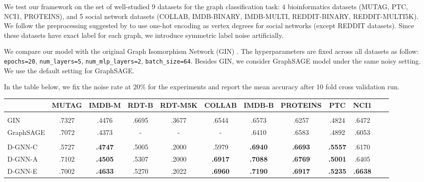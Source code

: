 \documentclass[portrait,final,a0paper,fontscale=0.365]{baposter}
\begin{document}
\begin{poster}
{\begin{multicols}{2}
\columnbreak

\vspace*{0.5em}
\noindent
We test our framework on the set of well-studied 9 datasets for the graph 
classification task: 4 bioinformatics datasets (MUTAG, PTC, NCI1, PROTEINS),
and 5 social network datasets (COLLAB, IMDB-BINARY, IMDB-MULTI, REDDIT-BINARY, REDDIT-MULTI5K). We follow the preprocessing suggested by \cite{xu2018how} 
to use one-hot encoding as vertex degrees for social networks (except REDDIT datasets). Since these datasets have exact 
label for each graph, we introduce symmetric label noise artificially.
\end{multicols}

\noindent
We compare our model with the original Graph Isomorphism Network (GIN) \cite{xu2018how}.
The hyperparameters are fixed across all datasets as follow: \texttt{epochs=20}, 
\texttt{num\_layers=5}, \texttt{num\_mlp\_layers=2}, \texttt{batch\_size=64}.
Besides GIN, we consider GraphSAGE model \cite{hamilton2017inductive} under the same noisy setting. We use the default setting for GraphSAGE.


\vspace{1em}
\noindent
In the table below, we fix the noise rate at 20\% for the experiments and report the mean accuracy after 10 fold cross validation run.  

\vspace{1em}

\hspace{1em}
  \begin{tabular}{lccccccccccc}
                                 & MUTAG   & IMDB-M    & RDT-B   & RDT-M5K & COLLAB    & IMDB-B   & PROTEINS    & PTC         & NCI1 \\
    \hline \\
    GIN                          & .7327   & .4476     & .6695   & .3677   & .6544     & .6573    & .6257       & .4824       & .6472 \\
    GraphSAGE                    & .7072   & .4373     &   -     & -       & -         & .6410    & .6583       & .4892       & .6053 
    \vspace{0.5em}\\
    \hline \vspace{-0.5em} \\
    D-GNN-C                      &  .5727  &  \bf.4747 & .5005   & .2000   &  .5979    & \bf.6940 & \bf.6693    & \bf.5557       &  .6170 \\
    D-GNN-A                      &  .7102  &  \bf.4505 & .5307   & .2000   &  \bf.6917 & \bf.7088 & \bf.6769    & \bf.5001       & .6405  \\
    D-GNN-E                      &  .7002  &  \bf.4633 & .5270   & .2022   &  \bf.6960 & \bf.7190 & \bf.6917    & \bf.5235       & \bf.6638 \\
  \end{tabular}

}
\end{poster}
\end{document}
